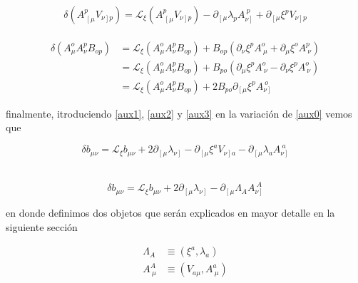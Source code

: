 \documentclass{article}
\numberwithin{equation}{section}
\begin{document}
\begin{equation}\label{aux2}
\delta \left( A^p_{\ \left[ \mu\right.} V_{\left.\nu \right] p}\right) = \mathcal{L}_{\xi} \left( A^p_{\ \left[ \mu\right.} V_{\left.\nu \right] p}\right) - \partial_{\left[\mu \right.} \lambda_p A_{\left. \nu \right]}^{\ p} + \partial_{\left[\mu \right.} \xi^p V_{\left. \nu \right] p}
\end{equation}\\


\begin{equation}\label{aux3}
\begin{aligned}
\delta \left( A^o_{\mu} A^p_{\nu} B_{o p} \right) &= \mathcal{L}_{\xi} \left( A^o_{\mu} A^p_{\nu} B_{o p} \right) + B_{o p} \left( \partial_{\nu} \xi^p A^o_{\ \mu} + \partial_{\mu} \xi^o A^p_{\ \nu}  \right)\\
&= \mathcal{L}_{\xi} \left( A^o_{\mu} A^p_{\nu} B_{o p} \right) + B_{p o} \left( \partial_{\mu} \xi^p A^o_{\ \nu} - \partial_{\nu} \xi^p A^o_{\ \nu}  \right)\\
&= \mathcal{L}_{\xi} \left( A^o_{\mu} A^p_{\nu} B_{o p} \right) + 2 B_{p o} \partial_{\left[\mu \right.} \xi^p A_{\left. \nu \right]}^{\ o}
\end{aligned}
\end{equation}
 

finalmente, itroduciendo \ref{aux1}, \ref{aux2} y \ref{aux3} en la variación de \ref{aux0} vemos que

\begin{equation*}
\delta b_{\mu \nu} = \mathcal{L}_{\xi} b_{\mu \nu}+ 2 \partial_{\left[\mu \right.} \lambda_{\left. \nu \right]} - \partial_{\left[\mu \right.} \xi^a V_{\left. \nu \right] a} - \partial_{\left[\mu \right.} \lambda_a A_{\left. \nu \right]}^{\ a} 
\end{equation*}\\

\begin{boxquation}
	\begin{equation}\label{b}
	\delta b_{\mu \nu} = \mathcal{L}_{\xi} b_{\mu \nu} + 2 \partial_{\left[\mu \right.} \lambda_{\left. \nu \right]} - \partial_{\left[\mu \right.} \Lambda_A A^{\ A}_{\left. \nu \right]}
	\end{equation}
\end{boxquation}

en donde definimos dos objetos que serán explicados en mayor detalle en la siguiente sección

\begin{equation}\label{ADFT}
\begin{aligned}
\Lambda_A &\equiv \left( \xi^a, \lambda_a \right)\\
A_{\ \mu}^{A} &\equiv \left( V_{a \mu}, A_{\ \mu}^{ a} \right)
\end{aligned}
\end{equation}
\end{document}
